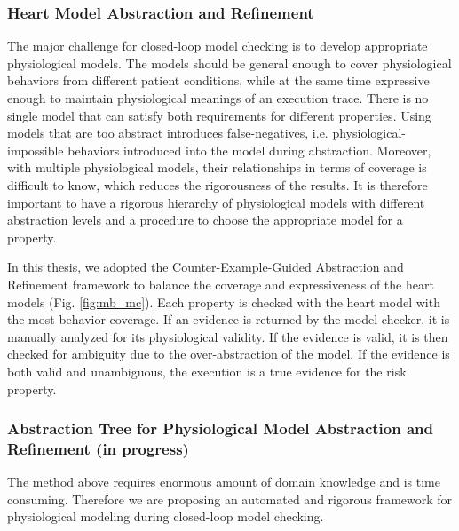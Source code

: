 \documentclass[a4paper,11pt]{article}
\begin{document}
\subsubsection{Heart Model Abstraction and Refinement}

The major challenge for closed-loop model checking is to develop appropriate physiological models. 
The models should be general enough to cover physiological behaviors from different patient conditions, while at the same time expressive enough to maintain physiological meanings of an execution trace.
There is no single model that can satisfy both requirements for different properties.
Using models that are too abstract introduces false-negatives, i.e. physiological-impossible behaviors introduced into the model during abstraction.
Moreover, with multiple physiological models, their relationships in terms of coverage is difficult to know, which reduces the rigorousness of the results.
It is therefore important to have a rigorous hierarchy of physiological models with different abstraction levels and a procedure to choose the appropriate model for a property.

In this thesis, we adopted the Counter-Example-Guided Abstraction and Refinement framework to balance the coverage and expressiveness of the heart models (Fig. \ref{fig:mb_mc}).
Each property is checked with the heart model with the most behavior coverage.
If an evidence is returned by the model checker, it is manually analyzed for its physiological validity.
If the evidence is valid, it is then checked for ambiguity due to the over-abstraction of the model. 
If the evidence is both valid and unambiguous, the execution is a true evidence for the risk property.
\subsubsection{Abstraction Tree for Physiological Model Abstraction and Refinement (in progress)}
The method above requires enormous amount of domain knowledge and is time consuming.
Therefore we are proposing an automated and rigorous framework for physiological modeling during closed-loop model checking.
\end{document}
